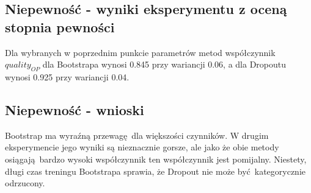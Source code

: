 \subsection{Niepewność - wyniki eksperymentu z oceną stopnia pewności}

Dla wybranych w poprzednim punkcie parametrów metod współczynnik $quality_{OP}$ dla Bootstrapa wynosi 0.845 przy wariancji 0.06, a dla Dropoutu wynosi 0.925 przy wariancji 0.04.

\subsection{Niepewność - wnioski}
Bootstrap ma wyraźną przewagę dla większości czynników. W drugim eksperymencie jego wyniki są nieznacznie gorsze, ale jako że obie metody osiągają bardzo wysoki współczynnik ten współczynnik jest pomijalny. Niestety, długi czas treningu Bootstrapa sprawia, że Dropout nie może być kategorycznie odrzucony.



